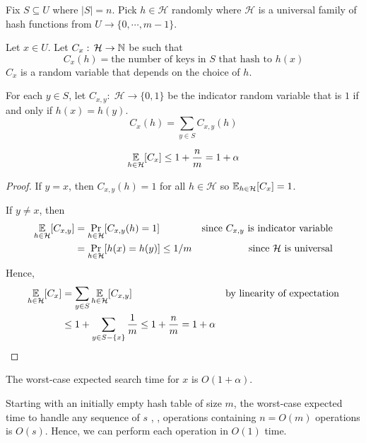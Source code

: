 Fix $S \subseteq U$ where $|S|=n$. Pick $h \in \mathcal{H}$ randomly where $\mathcal{H}$ is a universal family of hash functions from $U \to \{0,\cdots,m-1\}$.

Let $x \in U$. Let $C_x:\, \mathcal{H} \to \mathbb{N}$ be such that
$$
C_x(h) = \text{the number of keys in $S$ that hash to $h(x)$}
$$
$C_x$ is a random variable that depends on the choice of $h$.

For each $y \in S$, let $C_{x,y}:\; \mathcal{H} \to \{0,1\}$ be the indicator random variable that is $1$ if and only if $h(x)=h(y)$.
$$
C_x(h) = \sum_{y \in S} C_{x,y}(h)
$$

\begin{theorem}
    $$
    \operatorname*{\mathbb{E}}_{h\in\mathcal{H}}[C_x] \leq 1+\frac{n}{m} = 1 + \alpha
    $$
\end{theorem}

\begin{proof}
    If $y=x$, then $C_{x,y}(h)=1$ for all $h \in \mathcal{H}$ so $\operatorname*{\mathbb{E}}_{h\in\mathcal{H}}[C_x] = 1$.

    If $y \neq x$, then
    $$
    \begin{aligned}
        \operatorname*{\mathbb{E}}_{h\in\mathcal{H}}[C_{x,y}] &= \Pr_{h\in\mathcal{H}}[C_{x,y}(h) = 1] & \text{since $C_{x,y}$ is indicator variable} \\
        &= \Pr_{h\in\mathcal{H}}[h(x)=h(y)] \leq 1/m & \text{since $\mathcal{H}$ is universal}
    \end{aligned}
    $$
    Hence,
    $$
    \begin{aligned}
        \operatorname*{\mathbb{E}}_{h\in\mathcal{H}}[C_x] &= \sum_{y\in S}\operatorname*{\mathbb{E}}_{h\in\mathcal{H}}[C_{x,y}] & \text{by linearity of expectation} \\
        &\leq 1 + \sum_{y \in S-\{x\}} \frac{1}{m} \leq 1 + \frac{n}{m} = 1+\alpha
    \end{aligned}
    $$
\end{proof}

\begin{corollary}
    The worst-case expected search time for $x$ is $O(1+\alpha)$.
\end{corollary}

\begin{corollary}
    Starting with an initially empty hash table of size $m$, the worst-case expected time to handle any sequence of $s$ , ,  operations containing $n = O(m)$  operations is $O(s)$. Hence, we can perform each operation in $O(1)$ time.
\end{corollary}

